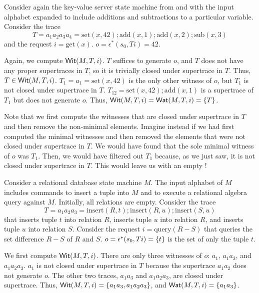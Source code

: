 \begin{example}
  \newcommand{\Mget}{\text{get}}
  \newcommand{\Mset}{\text{set}}
  \newcommand{\Madd}{\text{add}}
  \newcommand{\Msub}{\text{sub}}
  Consider again the key-value server state machine from
   and  with the input
  alphabet expanded to include additions and subtractions to a particular
  variable. Consider the trace
  \[
    T = a_1 a_2 a_3 a_4 = \Mset(x, 42); \Madd(x, 1); \Madd(x, 2); \Msub(x, 3)
  \]
  and the request $i = \Mget(x)$. $o = \epsilon^*(s_0, Ti) = 42$.

  Again, we compute $\textsf{Wit}(M, T, i)$. $T$ suffices to generate $o$, and $T$
  does not have any proper supertraces in $T$, so it is trivially closed under
  supertrace in $T$. Thus, $T \in \textsf{Wit}(M, T, i)$.
  $T_1 = a_1 = \Mset(x, 42)$ is the only other witness of $o$, but $T_1$ is not
  closed under supertrace in $T$. $T_{12} = \Mset(x, 42); \Madd(x, 1)$ is a
  supertrace of $T_1$ but does not generate $o$.
  Thus, $\textsf{Wit}(M, T, i) = \textsf{Wat}(M, T, i) = \{T\}$.

  Note that we first compute the witnesses that are closed under supertrace in
  $T$ and then remove the non-minimal elements. Imagine instead if we had first
  computed the minimal witnesses and then removed the elements that were not
  closed under supertrace in $T$. We would have found that the sole minimal
  witness of $o$ was $T_1$. Then, we would have filtered out $T_1$ because, as
  we just saw, it is not closed under supertrace in $T$. This would leave us
  with an empty \watprovenance{}!
\end{example}

\begin{example}
  \newcommand{\Mins}{\text{insert}}
  \newcommand{\Mquery}{\text{query}}
  Consider a relational database state machine $M$. The input alphabet of $M$
  includes commands to insert a tuple into $M$ and to execute a relational
  algebra query against $M$. Initially, all relations are empty. Consider the
  trace
  \[
    T = a_1 a_2 a_3 = \Mins(R, t); \Mins(R, u); \Mins(S, u)
  \]
  that inserts tuple $t$ into relation $R$, inserts tuple $u$ into relation
  $R$, and inserts tuple $u$ into relation $S$. Consider the request $i =
  \Mquery(R - S)$ that queries the set difference $R - S$ of $R$ and $S$. $o =
  \epsilon^*(s_0, Ti) = \{t\}$ is the set of only the tuple $t$.

  We first compute $\textsf{Wit}(M, T, i)$. There are only three witnesses of $o$:
  $a_1$, $a_1a_3$, and $a_1a_2a_3$. $a_1$ is not closed under supertrace in
  $T$ because the supertrace $a_1a_2$ does not generate $o$. The other two
  traces, $a_1a_3$ and $a_1a_2a_3$, are closed under supertrace. Thus, $\textsf{Wit}(M,
  T, i) = \{a_1a_3, a_1a_2a_3\}$, and $\textsf{Wat}(M, T, i) = \{a_1a_3\}$.
\end{example}

